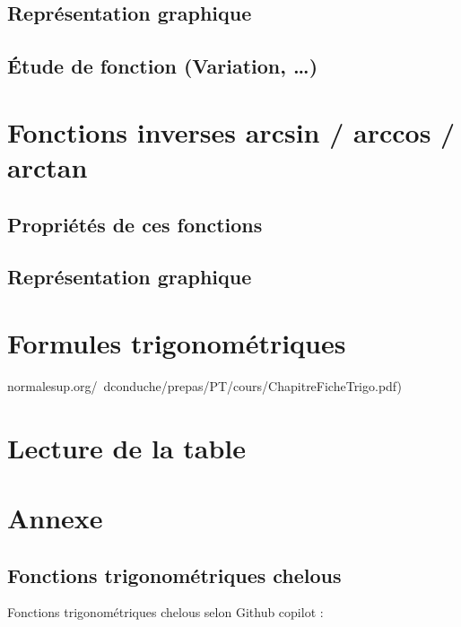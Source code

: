 \documentclass[a4paper]{article}
\begin{document}
		\subsection{Représentation graphique}

		\subsection{Étude de fonction (Variation, …)}

	\section{Fonctions inverses arcsin / arccos / arctan}

		\subsection{Propriétés de ces fonctions}

		\subsection{Représentation graphique}

	\section{Formules trigonométriques}

		normalesup.org/~dconduche/prepas/PT/cours/ChapitreFicheTrigo.pdf)

	\section{Lecture de la table}

	\section{Annexe}

		\subsection*{Fonctions trigonométriques chelous} \label{fonction_trigo_chelous}

		Fonctions trigonométriques chelous selon Github copilot :
\end{document}
